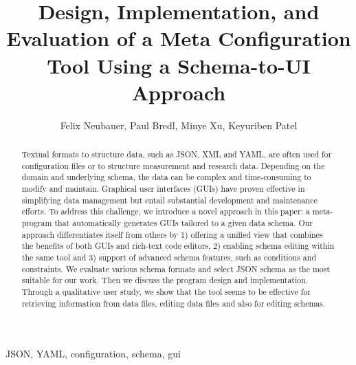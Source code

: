 \documentclass[lettersize,journal]{IEEEtran}
\begin{document}
 \title{Design, Implementation, and Evaluation of a Meta Configuration Tool Using a Schema-to-UI Approach}
 \author{Felix Neubauer, Paul Bredl, Minye Xu, Keyuriben Patel}



 \maketitle

 \begin{abstract}
 Textual formats to structure data, such as JSON, XML and YAML, are often used for configuration files or to structure measurement and research data.
 Depending on the domain and underlying schema, the data can be complex and time-consuming to modify and maintain.
 Graphical user interfaces (GUIs) have proven effective in simplifying data management but entail substantial development and maintenance efforts.
 To address this challenge, we introduce a novel approach in this paper: a meta-program that automatically generates GUIs tailored to a given data schema.
 Our approach differentiates itself from others by 1) offering a unified view that combines the benefits of both GUIs and rich-text code editors, 2) enabling schema editing within the same tool and 3) support of advanced schema features, such as conditions and constraints.
 We evaluate various schema formats and select JSON schema as the most suitable for our work.
 Then we discuss the program design and implementation.
 Through a qualitative user study, we show that the tool seems to be effective for retrieving information from data files, editing data files and also for editing schemas.



 \end{abstract}

 \begin{IEEEkeywords}
  JSON, YAML, configuration, schema, gui
 \end{IEEEkeywords}
\end{document}
